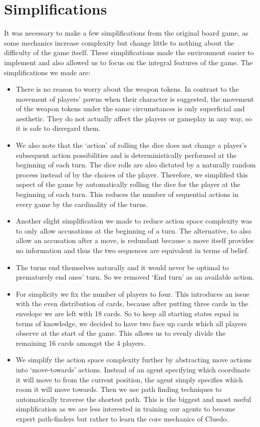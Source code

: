 \documentclass[msc, ai, twoside, notimes, logo, parskip, leftchapter, normalheadings]{infthesis}
\begin{document}
\section{Simplifications}
It was necessary to make a few simplifications from the original board game, as some mechanics increase complexity but change little to nothing about the difficulty of the game itself. These simplifications made the environment easier to implement and also allowed us to focus on the integral features of the game. The simplifications we made are:
\begin{itemize}
\item There is no reason to worry about the weapon tokens. In contrast to the movement of players' pawns when their character is suggested, the movement of the weapon tokens under the same circumstances is only superficial and aesthetic. They do not actually affect the players or gameplay in any way, so it is safe to disregard them. 
\item We also note that the `action' of rolling the dice does not change a player's subsequent action possibilities and is deterministically performed at the beginning of each turn. The dice rolls are also dictated by a naturally random process instead of by the choices of the player. Therefore, we simplified this aspect of the game by automatically rolling the dice for the player at the beginning of each turn. This reduces the number of sequential actions in every game by the cardinality of the turns.
\item Another slight simplification we made to reduce action space complexity was to only allow accusations at the beginning of a turn. The alternative, to also allow an accusation after a move, is redundant because a move itself provides no information and thus the two sequences are equivalent in terms of belief.
\item The turns end themselves naturally and it would never be optimal to prematurely end ones' turn. So we removed `End turn' as an available action.
\item For simplicity we fix the number of players to four. This introduces an issue with the even distribution of cards, because after putting three cards in the envelope we are left with 18 cards. So to keep all starting states equal in terms of knowledge, we decided to have two face up cards which all players observe at the start of the game. This allows us to evenly divide the remaining 16 cards amongst the 4 players.
\item We simplify the action space complexity further by abstracting move actions into `move-towards' actions. Instead of an agent specifying which coordinate it will move to from the current position, the agent simply specifies which room it will move towards. Then we use path finding techniques to automatically traverse the shortest path. This is the biggest and most useful simplification as we are less interested in training our agents to become expert path-finders but rather to learn the core mechanics of Cluedo.

\end{itemize}
\end{document}
